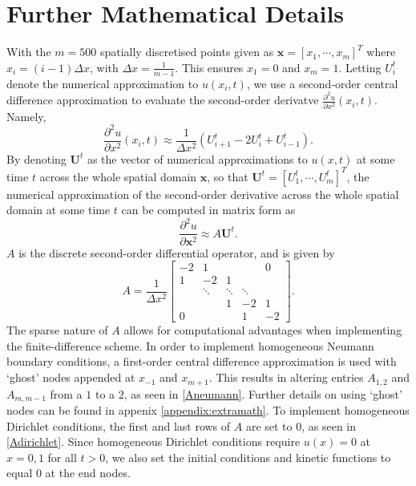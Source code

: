 \chapter{Further Mathematical Details}\label{section:appA}
With the $m=500$ spatially discretised points given as $\textbf{x}=[x_1,\cdots,x_m]^T$ where $x_i=(i-1)\Delta x$, with $\Delta x=\frac{1}{m-1}$. This ensures $x_1=0$ and $x_m=1$. Letting $U_i^t$ denote the numerical approximation to $u(x_i,t)$, we use a second-order central difference approximation \cite{finitediff} to evaluate the second-order derivatve $\frac{\partial^2 u}{\partial x^2}(x_i,t)$. Namely,
\begin{equation}
\frac{\partial^2 u}{\partial x^2}(x_i,t)\approx\frac{1}{\Delta x^2}\left(U_{i+1}^t-2U_i^t+U_{i-1}^t\right).
\end{equation}
By denoting $\textbf{U}^t$ as the vector of numerical approximations to $u(x,t)$ at some time $t$ across the whole spatial domain $\textbf{x}$, so that $\textbf{U}^t=\left[U_1^t,\cdots,U_m^t\right]^T$, the numerical approximation of the second-order derivative across the whole spatial domain at some time $t$ can be computed in matrix form as
\begin{equation}
    \frac{\partial^2 u}{\partial \textbf{x}^2}\approx A\textbf{U}^t.
\end{equation}
$A$ is the discrete second-order differential operator, and is given by
\begin{equation}\label{A}
A=\frac{1}{\Delta x^2}\begin{bmatrix}
   -2&  1&  &  & 0\\
   1&  -2&  1&  & \\
   &  \ddots&  \ddots&  \ddots& \\
   &  &  1&  -2& 1\\
   0&  &  &  1& -2
  \end{bmatrix}.
\end{equation}
The sparse nature of $A$ allows for computational advantages when implementing the finite-difference scheme. In order to implement homogeneous Neumann boundary conditions, a first-order central difference approximation is used with `ghost' nodes appended at $x_{-1}$ and $x_{m+1}$. This results in altering entries $A_{1,2}$ and $A_{m,m-1}$ from a $1$ to a $2$, as seen in \eqref{Aneumann}. Further details on using `ghost' nodes can be found in appenix \ref{appendix:extramath}. To implement homogeneous Dirichlet conditions, the first and last rows of $A$ are set to $0$, as seen in \eqref{Adirichlet}. Since homogeneous Dirichlet conditions require $u(x)=0$ at $x=0,1$ for all $t>0$, we also set the initial conditions and kinetic functions to equal $0$ at the end nodes.
